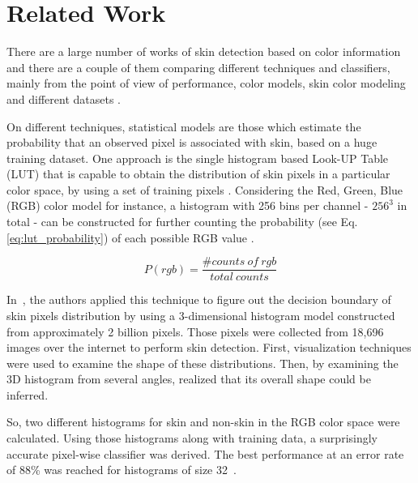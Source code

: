 \chapter{Related Work}
\label{cap:related-work}

There are a large number of works of skin detection based on color information and there are a couple of them comparing different techniques and classifiers, mainly from the point of view of performance, color models, skin color modeling and different datasets \citep{vezhnevets:03,kakumanu:07,mahmoodi:16}.

On different techniques, statistical models are those which estimate the probability that an observed pixel is associated with skin, based on a huge training dataset. One approach is the single histogram based Look-UP Table (LUT) that is capable to obtain the distribution of skin pixels in a particular color space, by using a set of training pixels \citep{mahmoodi:16}. Considering the Red, Green, Blue (RGB) color model for instance, a histogram with 256 bins per channel - $256^3$ in total - can be constructed for further counting the probability (see Eq. \ref{eq:lut_probability}) of each possible RGB value \citep{jones:02}.

\begin{equation*}
    P(rgb) = \frac{\# counts~of~rgb}{total~counts}
    \label{eq:lut_probability}
\end{equation*}

In~\citet{jones:02}, the authors applied this technique to figure out the decision boundary of skin pixels distribution by using a $3$-dimensional histogram model constructed from approximately 2 billion pixels. Those pixels were collected from 18,696 images over the internet to perform skin detection. First, visualization techniques were used to examine the shape of these distributions. Then, by examining the 3D histogram from several angles, \citet{jones:02} realized that its overall shape could be inferred.

So, two different histograms for skin and non-skin in the RGB color space were calculated. Using those histograms along with training data, a surprisingly accurate pixel-wise classifier was derived. The best performance at an error rate of 88\% was reached for histograms of size 32~\citep{jones:02}.

